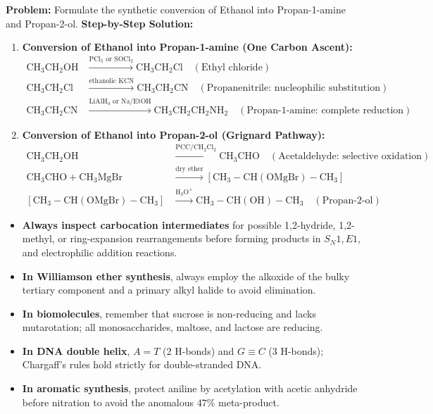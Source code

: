 \documentclass[10pt,a4paper]{article}
\begin{document}
\begin{usecasebox}
\textbf{Problem:} Formulate the synthetic conversion of Ethanol into Propan-1-amine and Propan-2-ol.
\textbf{Step-by-Step Solution:}
\begin{enumerate}[leftmargin=*]
  \item \textbf{Conversion of Ethanol into Propan-1-amine (One Carbon Ascent):}
  \begin{align}
    \mathrm{CH_3CH_2OH} &\xrightarrow{\mathrm{PCl_5 \text{ or } SOCl_2}} \mathrm{CH_3CH_2Cl} \quad (\text{Ethyl chloride})\\
    \mathrm{CH_3CH_2Cl} &\xrightarrow{\text{ethanolic } \mathrm{KCN}} \mathrm{CH_3CH_2CN} \quad (\text{Propanenitrile: nucleophilic substitution})\\
    \mathrm{CH_3CH_2CN} &\xrightarrow{\mathrm{LiAlH_4 \text{ or } Na / EtOH}} \mathbf{\mathrm{CH_3CH_2CH_2NH_2}} \quad (\text{Propan-1-amine: complete reduction})
  \end{align}
  \item \textbf{Conversion of Ethanol into Propan-2-ol (Grignard Pathway):}
  \begin{align}
    \mathrm{CH_3CH_2OH} &\xrightarrow{\mathrm{PCC / CH_2Cl_2}} \mathrm{CH_3CHO} \quad (\text{Acetaldehyde: selective oxidation})\\
    \mathrm{CH_3CHO} + \mathrm{CH_3MgBr} &\xrightarrow{\text{dry ether}} [\mathrm{CH_3-CH(OMgBr)-CH_3}]\\
    [\mathrm{CH_3-CH(OMgBr)-CH_3}] &\xrightarrow{\mathrm{H_3O^+}} \mathbf{\mathrm{CH_3-CH(OH)-CH_3}} \quad (\text{Propan-2-ol})
  \end{align}
\end{enumerate}
\end{usecasebox}

\begin{conceptbox}
\begin{itemize}
  \item \textbf{Always inspect carbocation intermediates} for possible 1,2-hydride, 1,2-methyl, or ring-expansion rearrangements before forming products in $S_N1, E1$, and electrophilic addition reactions.
  \item \textbf{In Williamson ether synthesis}, always employ the alkoxide of the bulky tertiary component and a primary alkyl halide to avoid elimination.
  \item \textbf{In biomolecules}, remember that sucrose is non-reducing and lacks mutarotation; all monosaccharides, maltose, and lactose are reducing.
  \item \textbf{In DNA double helix}, $A=T$ (2 H-bonds) and $G\equiv C$ (3 H-bonds); Chargaff's rules hold strictly for double-stranded DNA.
  \item \textbf{In aromatic synthesis}, protect aniline by acetylation with acetic anhydride before nitration to avoid the anomalous $47\%$ meta-product.
\end{itemize}
\end{conceptbox}
\end{document}
